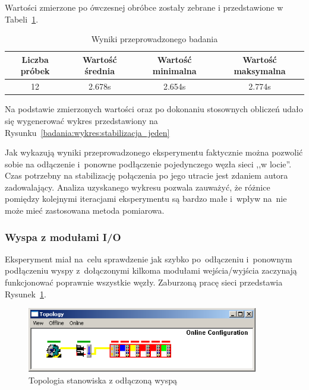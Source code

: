 Wartości zmierzone po ówczesnej obróbce zostały zebrane i przedstawione w Tabeli~\ref{badania:wyniki:stabilizacja_jeden}.
\begin{table}[!htb]
\begin{center}
\begin{tabular}{| c | c | c | c |}\hline
\textbf{Liczba próbek} & \textbf{Wartość średnia} & \textbf{Wartość minimalna} & \textbf{Wartość maksymalna} \\\hline\hline
12 & 2.678s & 2.654s & 2.774s \\\hline
\end{tabular}
\end{center}
\vspace*{-6mm}
  \caption{Wyniki przeprowadzonego badania}
	\label{badania:wyniki:stabilizacja_jeden}
\end{table}

Na podstawie zmierzonych wartości oraz po dokonaniu stosownych obliczeń udało się wygenerować wykres przedstawiony na Rysunku~\ref{badania:wykres:stabilizacja_jeden}


Jak wykazują wyniki przeprowadzonego eksperymentu faktycznie można pozwolić sobie na odłączenie i~ponowne podłączenie pojedynczego węzła sieci ,,w locie''. Czas potrzebny na stabilizację połączenia po jego utracie jest zdaniem autora zadowalający. Analiza uzyskanego wykresu pozwala zauważyć, że różnice pomiędzy kolejnymi iteracjami eksperymentu są bardzo małe i~wpływ na~nie może mieć zastosowana metoda pomiarowa.

\subsubsection{Wyspa z modułami I/O}
Eksperyment miał na~celu sprawdzenie jak szybko po~odłączeniu i~ponownym podłączeniu wyspy z~dołączonymi kilkoma modułami wejścia/wyjścia zaczynają funkcjonować poprawnie wszystkie węzły. Zaburzoną pracę sieci przedstawia Rysunek~\ref{coupler}.
\begin{figure}[!htb] 	\centering 	\includegraphics[width=0.9\textwidth]{images/topologyCPerror} \caption{Topologia stanowiska z odłączoną wyspą} \label{coupler} \end{figure}


